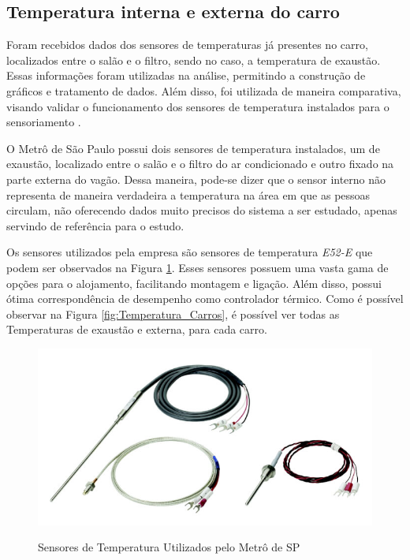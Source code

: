 \documentclass[acronym,symbols,table]{fei}
\begin{document}
\subsection{Temperatura interna e externa do carro} 
    
    Foram recebidos dados dos sensores de temperaturas já presentes no carro, localizados entre o salão e o filtro, sendo no caso, a temperatura de exaustão. Essas informações foram utilizadas na análise, permitindo a construção de gráficos e tratamento de dados. Além disso, foi utilizada de maneira comparativa, visando validar o funcionamento dos sensores de temperatura instalados para o sensoriamento \cite{metrosp2024}. 

    O Metrô de São Paulo possui dois sensores de temperatura instalados, um de exaustão, localizado entre o salão e o filtro do ar condicionado e outro fixado na parte externa do vagão. Dessa maneira, pode-se dizer que o sensor interno não representa de maneira verdadeira a temperatura na área em que as pessoas circulam, não oferecendo dados muito precisos do sistema a ser estudado, apenas servindo de referência para o estudo.

    Os sensores utilizados pela empresa são sensores de temperatura \textit{E52-E} que podem ser observados na Figura \ref{fig:Sensores_Metro}. Esses sensores possuem uma vasta gama de opções para o alojamento, facilitando montagem e ligação. Além disso, possui ótima correspondência de desempenho como controlador térmico. Como é possível observar na Figura \ref{fig:Temperatura_Carros}, é possível ver todas as Temperaturas de exaustão e externa, para cada carro.
    
    
    \begin{figure}[!htb]
    \centering
    \caption{Sensores de Temperatura Utilizados pelo Metrô de SP}
    \includegraphics[width=1\linewidth]{Imagens/Sensor_Metro.jpg}
    \label{fig:Sensores_Metro}
    \end{figure}
\end{document}
